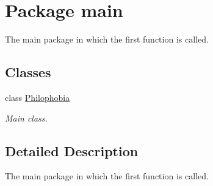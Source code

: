 \hypertarget{namespacemain}{\section{Package main}
\label{namespacemain}
}


The main package in which the first function is called.  


\subsection*{Classes}
\begin{DoxyCompactItemize}
\item 
class \hyperlink{classmain_1_1_philophobia}{Philophobia}
\begin{DoxyCompactList}\small\item\em Main class. \end{DoxyCompactList}\end{DoxyCompactItemize}


\subsection{Detailed Description}
The main package in which the first function is called. 